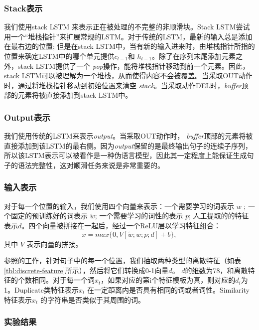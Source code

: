 \subsubsection*{Stack表示}

我们使用stack LSTM 来表示正在被处理的不完整的非顺滑块。Stack LSTM尝试用一个“堆栈指针”来扩展常规的LSTM。对于传统的LSTM，最新的输入总是添加在最右边的位置; 但是在stack LSTM中，当有新的输入进来时，由堆栈指针所指的位置来确定LSTM中的哪个单元提供$c_{t-1}$和 $h_{t-1}$。除了在序列末尾添加元素之外，stack LSTM提供了一个 \textit{pop}操作，能将堆栈指针移动到前一个元素。因此，stack LSTM可以被理解为一个堆栈，从而使得内容不会被覆盖。当采取OUT动作时，通过将堆栈指针移动到初始位置来清空 \textit{stack}。当采取动作DEL时，\textit{buffer}顶部的元素将被直接添加到stack LSTM中。

\subsubsection*{Output表示}

我们使用传统的LSTM来表示\textit{output}。当采取OUT动作时， \textit{buffer}顶部的元素将被直接添加到该LSTM的最右侧。因为\textit{output}保留的是最终输出句子的连续子序列，所以该LSTM表示可以被看作是一种伪语言模型，因此其一定程度上能保证生成句子的语法完整性，这对顺滑任务来说是非常重要的。


\subsubsection{输入表示}

对于每一个位置的输入，我们使用四个向量来表示：一个需要学习的词表示  $w$ ; 一个固定的预训练好的词表示 $\widetilde{w}$; 一个需要学习的词性的表示 $p$; 人工提取的的特征表示$d$。四个向量被拼接在一起后，经过一个ReLU层以学习特征组合：
\begin{equation}
x = max \{ 0, V[\widetilde{w}; w; p; d] + b \},\nonumber
\end{equation}
其中 $V$ 表示向量的拼接。

参照的工作，针对句子中的每一个位置，我们抽取两种类型的离散特征（如表\ref{tbl:discrete-feature}所示），然后将它们转换成0-1向量$d$。 $d$的维数为78，和离散特征的个数相同。对于每一个词$x_{t}$，如果对应的第i个特征模板为真，则对应的$d_{i}$为1。Duplicate类特征表示$x_{t}$ 在一定距离内是否具有相同的词或者词性。Similarity特征表示$x_{t}$ 的字符串是否类似于其周围的词。

\subsubsection{实验结果}


